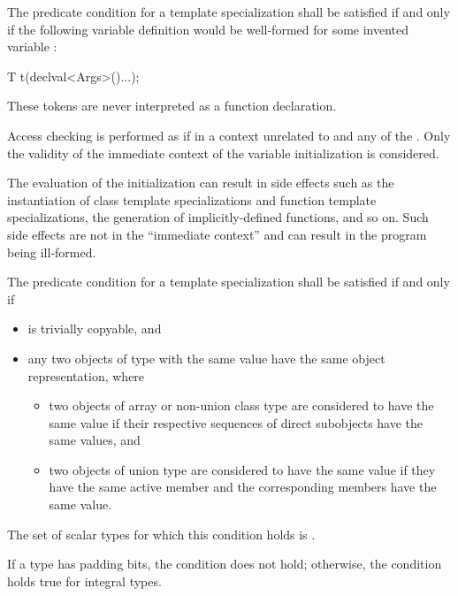%
\pnum
The predicate condition for a template specialization
 shall be satisfied if and only if the
following variable definition would be well-formed for some invented variable :

\begin{codeblock}
T t(declval<Args>()...);
\end{codeblock}

\begin{note}
These tokens are never interpreted as a function declaration.
\end{note}
Access checking is performed as if in a context unrelated to 
and any of the . Only the validity of the immediate context of the
variable initialization is considered.
\begin{note}
The evaluation of the
initialization can result in side effects such as the instantiation of class
template specializations and function template specializations, the generation
of implicitly-defined functions, and so on. Such side effects are not in the
``immediate context'' and can result in the program being ill-formed.
\end{note}

%
\pnum
The predicate condition for a template specialization
shall be satisfied if and only if
\begin{itemize}
\item {} is trivially copyable, and
\item any two objects of type  with the same value
have the same object representation, where
\begin{itemize}
\item two objects of array or non-union class type are considered to have the same value
if their respective sequences of direct subobjects have the same values, and
\item two objects of union type are considered to have the same value
if they have the same active member and the corresponding members have the same value.
\end{itemize}
\end{itemize}
The set of scalar types for which this condition holds is
.
\begin{note}
If a type has padding bits, the condition does not hold;
otherwise, the condition holds true for integral types.
\end{note}

